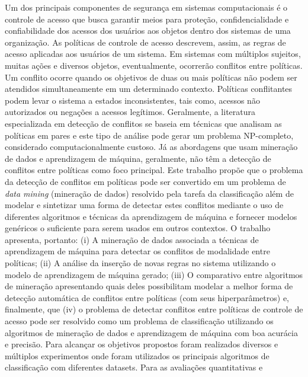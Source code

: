 \documentclass[
	12pt,				%
	openright,			%
	oneside,			%
	a4paper,			%
	english,			%
	french,				%
	spanish,			%
	brazil				%
	]{abntex2}
\begin{document}

\setlength{\absparsep}{18pt} %
\begin{resumo}
Um dos principais componentes de segurança em sistemas computacionais é o controle de acesso que busca garantir meios para proteção, confidencialidade e confiabilidade dos acessos dos usuários aos objetos dentro dos sistemas de uma organização. As políticas de controle de acesso descrevem, assim, as regras de acesso aplicadas aos usuários de um sistema. Em sistemas com múltiplos sujeitos, muitas ações e diversos objetos, eventualmente, ocorrerão conflitos entre políticas. Um conflito ocorre quando os objetivos de duas ou mais políticas não podem ser atendidos simultaneamente em um determinado contexto. Políticas conflitantes podem levar o sistema a estados inconsistentes, tais como, acessos não autorizados ou negações a acessos legítimos. Geralmente, a literatura especializada em detecção de conflitos se baseia em técnicas que analisam as políticas em pares e este tipo de análise pode gerar um problema NP-completo, considerado computacionalmente custoso. Já as abordagens que usam mineração de dados e aprendizagem de máquina, geralmente, não têm a detecção de conflitos entre políticas como foco principal. Este trabalho propõe que o problema da detecção de conflitos em políticas pode ser convertido em um problema de \textit{data mining} (mineração de dados) resolvido pela tarefa da classificação além de modelar e sintetizar uma forma de detectar estes conflitos mediante o uso de diferentes algoritmos e técnicas da aprendizagem de máquina e fornecer modelos genéricos o suficiente para serem usados em outros contextos. O trabalho apresenta, portanto: (i) A mineração de dados associada a técnicas de aprendizagem de máquina para detectar os conflitos de modalidade entre políticas; (ii) A análise da inserção de novas regras no sistema utilizando o modelo de aprendizagem de máquina gerado; (iii) O comparativo entre algoritmos de mineração apresentando quais deles possibilitam modelar a melhor forma de detecção automática de conflitos entre políticas (com seus hiperparâmetros) e, finalmente, que (iv) o problema de detectar conflitos  entre políticas de controle de acesso pode ser resolvido como um problema de classificação utilizando os algoritmos de mineração de dados e aprendizagem de máquina com boa acurácia e precisão. Para alcançar os objetivos propostos foram realizados diversos e múltiplos experimentos onde foram utilizados os principais algoritmos de classificação com diferentes datasets. Para as avaliações quantitativas e 
\end{resumo}
\end{document}
